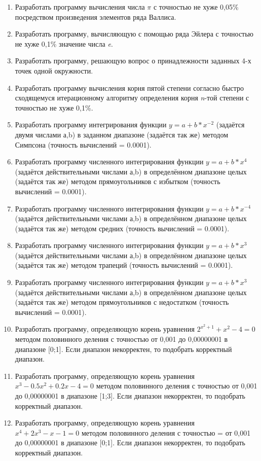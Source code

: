 \begin{enumerate}
    \item Разработать программу вычисления числа $\pi$ с точностью не хуже 0,05\% посредством произведения элементов ряда Валлиса.
    \item Разработать программу, вычисляющую с помощью  ряда Эйлера с точностью не хуже 0,1\% значение числа \textit{e}.
    \item Разработать программу, решающую вопрос о принадлежности заданных 4-х точек одной окружности.
    \item Разработать программу вычисления корня пятой степени согласно быстро сходящемуся итерационному алгоритму определения корня \textit{n}-той степени с точностью не хуже 0,1\%.
    \item Разработать программу интегрирования функции $y=a+b*x^{-2}$ (задаётся двумя числами а,b) в заданном диапазоне (задаётся так же) методом Симпсона (точность вычислений = 0.0001).
    \item Разработать программу численного интегрирования функции $y=a+b*x^4$ (задаётся действительными числами а,b) в определённом диапазоне целых (задаётся так же) методом прямоугольников с избытком (точность вычислений = 0.0001).
    \item Разработать программу численного интегрирования функции $y=a+b*x^{-4}$ (задаётся действительными числами а,b) в определённом диапазоне целых (задаётся так же) методом средних (точность вычислений = 0.0001).
    \item Разработать программу численного интегрирования функции $y=a+b*x^3$ (задаётся действительными числами а,b) в определённом диапазоне целых (задаётся так же) методом трапеций (точность вычислений = 0.0001).
    \item Разработать программу численного интегрирования функции $y=a+b*x^3$ (задаётся действительными числами а,b) в определённом диапазоне целых (задаётся так же) методом прямоугольников с недостатком (точность вычислений = 0.0001).
    \item Разработать программу, определяющую корень уравнения $2^{x^{2}+1}+x^2-4=0$ методом половинного деления с точностью от 0,001 до 0,00000001 в диапазоне [0;1]. Если диапазон некорректен, то подобрать корректный диапазон.
    \item Разработать программу, определяющую корень уравнения $x^3-0.5x^2+0.2x-4=0$ методом половинного деления с точностью  от 0,001 до 0,00000001 в диапазоне [1;3]. Если диапазон некорректен, то подобрать корректный диапазон.
    \item Разработать программу, определяющую корень уравнения $x^4+2x^3-x-1=0$ методом половинного деления с точностью = от 0,001 до 0,00000001 в диапазоне [0;1]. Если диапазон некорректен, то подобрать корректный диапазон.

\end{enumerate}
